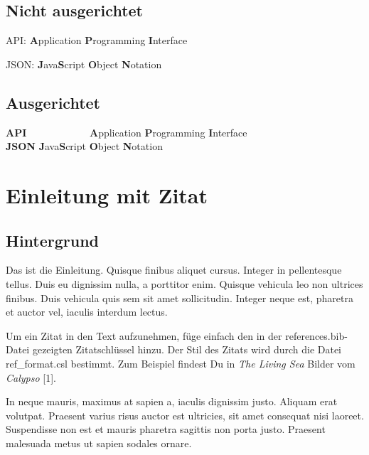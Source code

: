 \documentclass[listof=totoc,index=totoc,bibliography=totoc,12pt,ngerman,a4paper,]{report}
\begin{document}
\section*{Nicht ausgerichtet}\label{nicht-ausgerichtet}

API: \textbf{A}pplication \textbf{P}rogramming \textbf{I}nterface

JSON: \textbf{J}ava\textbf{S}cript \textbf{O}bject \textbf{N}otation

\section*{Ausgerichtet}\label{ausgerichtet}

\begin{tabbing}
\textbf{API}~~~~~~~~~~~~ \= \textbf{A}pplication \textbf{P}rogramming \textbf{I}nterface \\  
\textbf{JSON} \> \textbf{J}ava\textbf{S}cript \textbf{O}bject \textbf{N}otation \\  
\end{tabbing}

\newpage

\setcounter{page}{1}
\doublespacing
\setlength{\parindent}{0.5in}

\chapter{Einleitung mit Zitat}\label{sec:intro}

\section{Hintergrund}\label{hintergrund}

Das ist die Einleitung. Quisque finibus aliquet cursus. Integer in
pellentesque tellus. Duis eu dignissim nulla, a porttitor enim. Quisque
vehicula leo non ultrices finibus. Duis vehicula quis sem sit amet
sollicitudin. Integer neque est, pharetra et auctor vel, iaculis
interdum lectus.

Um ein Zitat in den Text aufzunehmen, füge einfach den in der
references.bib-Datei gezeigten Zitatschlüssel hinzu. Der Stil des Zitats
wird durch die Datei ref\_format.csl bestimmt. Zum Beispiel findest Du
in \emph{The Living Sea} Bilder vom \emph{Calypso} {[}1{]}.

In neque mauris, maximus at sapien a, iaculis dignissim justo. Aliquam
erat volutpat. Praesent varius risus auctor est ultricies, sit amet
consequat nisi laoreet. Suspendisse non est et mauris pharetra sagittis
non porta justo. Praesent malesuada metus ut sapien sodales ornare.
\end{document}
